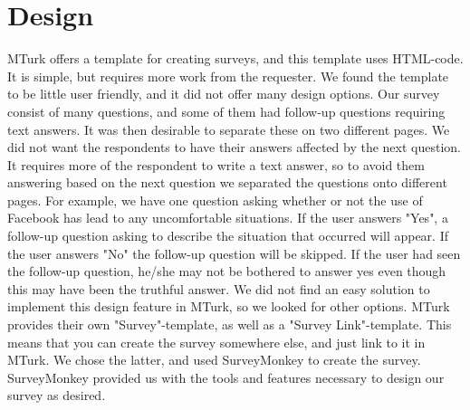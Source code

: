 \section{Design}
MTurk offers a template for creating surveys, and this template uses HTML-code. It is simple, but requires more work from the requester. We found the template to be little user friendly, and it did not offer many design options. Our survey consist of many questions, and some of them had follow-up questions requiring text answers. It was then desirable to separate these on two different pages. We did not want the respondents to have their answers affected by the next question. It requires more of the respondent to write a text answer, so to avoid them answering based on the next question we separated the questions onto different pages. For example, we have one question asking whether or not the use of Facebook has lead to any uncomfortable situations. If the user answers "Yes", a follow-up question asking to describe the situation that occurred will appear. If the user answers "No" the follow-up question will be skipped. If the user had seen the follow-up question, he/she may not be bothered to answer yes even though this may have been the truthful answer. We did not find an easy solution to implement this design feature in MTurk, so we looked for other options. MTurk provides their own "Survey"-template, as well as a "Survey Link"-template. This means that you can create the survey somewhere else, and just link to it in MTurk. We chose the latter, and used SurveyMonkey to create the survey. SurveyMonkey provided us with the tools and features necessary to design our survey as desired. 

